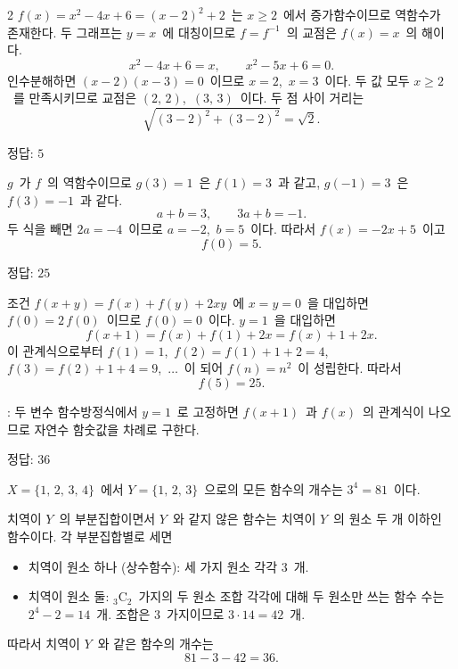 \documentclass[10pt,fleqn]{article}
\begin{document}
\begin{multicols*}{2}
$f(x) = x^{2} - 4x + 6 = (x - 2)^{2} + 2$\ 는 $x \ge 2$\ 에서 증가함수이므로 역함수가 존재한다. 두 그래프는 $y = x$\ 에 대칭이므로 $f = f^{-1}$\ 의 교점은 $f(x) = x$\ 의 해이다.
\[ x^{2} - 4x + 6 = x,\qquad x^{2} - 5x + 6 = 0. \]
인수분해하면 $(x - 2)(x - 3) = 0$\ 이므로 $x = 2$,\ $x = 3$\ 이다. 두 값 모두 $x \ge 2$\ 를 만족시키므로 교점은 $(2,\, 2)$,\ $(3,\, 3)$\ 이다. 두 점 사이 거리는
\[ \sqrt{(3 - 2)^{2} + (3 - 2)^{2}} = \sqrt{2}. \]

\begin{dmanswerbox}
정답: $5$
\end{dmanswerbox}

$g$\ 가 $f$\ 의 역함수이므로 $g(3) = 1$\ 은 $f(1) = 3$\ 과 같고, $g(-1) = 3$\ 은 $f(3) = -1$\ 과 같다.
\[ a + b = 3,\qquad 3a + b = -1. \]
두 식을 빼면 $2a = -4$\ 이므로 $a = -2$,\ $b = 5$\ 이다. 따라서 $f(x) = -2x + 5$\ 이고
\[ f(0) = 5. \]

\begin{dmanswerbox}
정답: $25$
\end{dmanswerbox}

조건 $f(x + y) = f(x) + f(y) + 2xy$\ 에 $x = y = 0$\ 을 대입하면 $f(0) = 2\, f(0)$\ 이므로 $f(0) = 0$\ 이다. $y = 1$\ 을 대입하면
\[ f(x + 1) = f(x) + f(1) + 2x = f(x) + 1 + 2x. \]
이 관계식으로부터 $f(1) = 1$,\ $f(2) = f(1) + 1 + 2 = 4$,\ $f(3) = f(2) + 1 + 4 = 9$,\ $\ldots$\ 이 되어 $f(n) = n^{2}$\ 이 성립한다. 따라서
\[ f(5) = 25. \]

\begin{dmcriticalpoint}
: 두 변수 함수방정식에서 $y = 1$\ 로 고정하면 $f(x + 1)$\ 과 $f(x)$\ 의 관계식이 나오므로 자연수 함숫값을 차례로 구한다.
\end{dmcriticalpoint}

\begin{dmanswerbox}
정답: $36$
\end{dmanswerbox}

$X = \{1,\, 2,\, 3,\, 4\}$\ 에서 $Y = \{1,\, 2,\, 3\}$\ 으로의 모든 함수의 개수는 $3^{4} = 81$\ 이다.

치역이 $Y$\ 의 부분집합이면서 $Y$\ 와 같지 않은 함수는 치역이 $Y$\ 의 원소 두 개 이하인 함수이다. 각 부분집합별로 세면
\begin{itemize}[leftmargin=6mm, itemsep=0.3mm, topsep=0.5mm]
  \item 치역이 원소 하나 (상수함수): 세 가지 원소 각각 $3$\ 개.
  \item 치역이 원소 둘: ${}_{3}\mathrm{C}_{2}$\ 가지의 두 원소 조합 각각에 대해 두 원소만 쓰는 함수 수는 $2^{4} - 2 = 14$\ 개. 조합은 $3$\ 가지이므로 $3 \cdot 14 = 42$\ 개.
\end{itemize}
따라서 치역이 $Y$\ 와 같은 함수의 개수는
\[ 81 - 3 - 42 = 36. \]


\end{multicols*}
\end{document}
